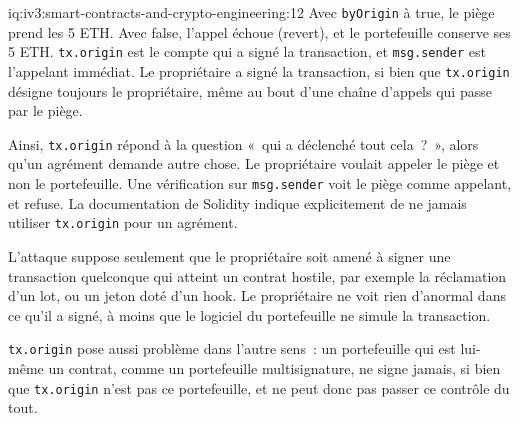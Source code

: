 \begin{solution}{iq:iv3:smart-contracts-and-crypto-engineering:12}
Avec \texttt{byOrigin} à true, le piège prend les 5 ETH. Avec false, l'appel échoue (revert), et le portefeuille conserve ses 5 ETH. \texttt{tx.origin} est le compte qui a signé la transaction, et \texttt{msg.sender} est l'appelant immédiat. Le propriétaire a signé la transaction, si bien que \texttt{tx.origin} désigne toujours le propriétaire, même au bout d'une chaîne d'appels qui passe par le piège.

Ainsi, \texttt{tx.origin} répond à la question «~qui a déclenché tout cela~?~», alors qu'un agrément demande autre chose. Le propriétaire voulait appeler le piège et non le portefeuille. Une vérification sur \texttt{msg.sender} voit le piège comme appelant, et refuse. La documentation de Solidity indique explicitement de ne jamais utiliser \texttt{tx.origin} pour un agrément.

L'attaque suppose seulement que le propriétaire soit amené à signer une transaction quelconque qui atteint un contrat hostile, par exemple la réclamation d'un lot, ou un jeton doté d'un hook. Le propriétaire ne voit rien d'anormal dans ce qu'il a signé, à moins que le logiciel du portefeuille ne simule la transaction.

\texttt{tx.origin} pose aussi problème dans l'autre sens~: un portefeuille qui est lui-même un contrat, comme un portefeuille multisignature, ne signe jamais, si bien que \texttt{tx.origin} n'est pas ce portefeuille, et ne peut donc pas passer ce contrôle du tout.

\end{solution}

